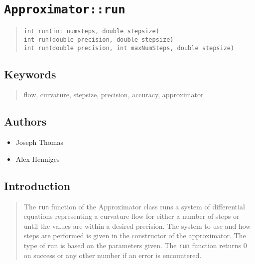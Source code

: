 \documentclass[10pt]{article}%
\begin{document}

\section*{\texttt{Approximator::run}}

\label{f0}\begin{quotation} {\small{\begin{verbatim} 
int run(int numsteps, double stepsize)        
int run(double precision, double stepsize)
int run(double precision, int maxNumSteps, double stepsize)
  \end{verbatim}
}}
\end{quotation}
\subsection*{Keywords}

\begin{quotation} flow, curvature, stepsize, precision, accuracy, approximator\end{quotation}

\subsection*{Authors}

\begin{itemize}\item  Joseph Thomas
\item  Alex Henniges
\end{itemize}

\subsection*{Introduction}

\begin{quotation} The \texttt{run} function of the Approximator class runs a system of differential equations representing a curvature flow for either a number of steps or until the values are within a desired precision. The system to use and how steps are performed is given in the constructor of the approximator. The type of run is based on the parameters given. The \texttt{run} function returns 0 on success or any other number if an error is encountered.\end{quotation}
\end{document}
